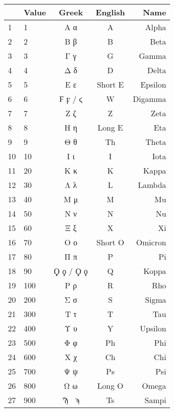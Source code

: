 \begin{center}
\fontsize{9.0}{10.0}\selectfont
  \begin{tabular}{ l | l | c | c | r }
    \-\  & Value & Greek & English & Name \\ \hline
    1 & 1 & \textgreek{Α α} & A & Alpha \\ \hline
    2 & 2 & \textgreek{Β β} & B & Beta \\ \hline
    3 & 3 & \textgreek{Γ γ} & G & Gamma \\ \hline
    4 & 4 & \textgreek{Δ δ} & D & Delta \\ \hline
    5 & 5 & \textgreek{Ε ε} & Short E & Epsilon \\ \hline
    6 & 6 & \textgreek{Ϝ ϝ / ϛ} & W & Digamma \\ \hline
    7 & 7 & \textgreek{Ζ ζ} & Z & Zeta \\ \hline
    8 & 8 & \textgreek{Η η} & Long E & Eta \\ \hline
    9 & 9 & \textgreek{Θ θ} & Th & Theta \\ \hline
    10 & 10 & \textgreek{Ι ι} & I & Iota \\ \hline
    11 & 20 & \textgreek{Κ κ} & K & Kappa \\ \hline
    12 & 30 & \textgreek{Λ λ} & L & Lambda \\ \hline
    13 & 40 & \textgreek{Μ μ} & M & Mu \\ \hline
    14 & 50 & \textgreek{Ν ν} & N & Nu \\ \hline
    15 & 60 & \textgreek{Ξ ξ} & X & Xi \\ \hline
    16 & 70 & \textgreek{Ο ο} & Short O & Omicron \\ \hline
    17 & 80 & \textgreek{Π π} & P & Pi \\ \hline
    18 & 90 & \textgreek{$\Qoppa{}$ $\qoppa{}$ / $\Koppa{}$ $\koppa$} & Q & Koppa \\ \hline
    19 & 100 & \textgreek{Ρ ρ} & R & Rho \\ \hline
    20 & 200 & \textgreek{Σ σ} & S & Sigma \\ \hline
    21 & 300 & \textgreek{Τ τ} & T & Tau \\ \hline
    22 & 400 & \textgreek{Υ υ} & Y & Upsilon \\ \hline
    23 & 500 & \textgreek{Φ φ} & Ph & Phi \\ \hline
    24 & 600 & \textgreek{Χ χ} & Ch & Chi \\ \hline
    25 & 700 & \textgreek{Ψ ψ} & Ps & Psi \\ \hline
    26 & 800 & \textgreek{Ω ω} & Long O & Omega \\ \hline
    27 & 900 & \textgreek{$\Sampi{}$ $\sampi{}$} & Ts & Sampi \\
  \end{tabular}
\end{center}
